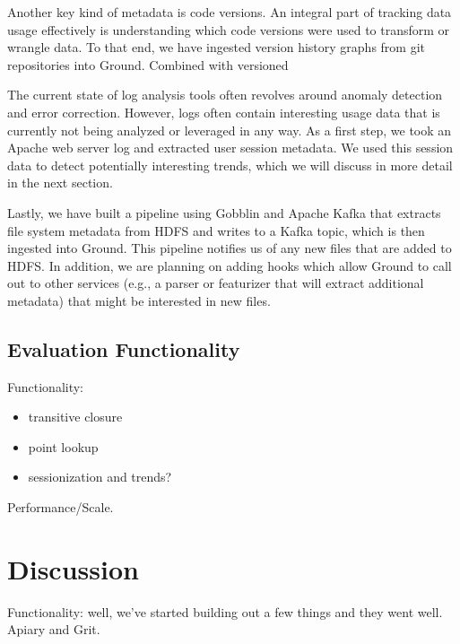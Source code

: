 \documentclass{sig-alternate}
\begin{document}
 Another key kind of metadata is code versions. An integral part of tracking data usage effectively is understanding which code versions were used to transform or wrangle data. To that end, we have ingested version history graphs from git repositories into Ground. Combined with versioned 

 The current state of log analysis tools often revolves around anomaly detection and error correction. However, logs often contain interesting usage data that is currently not being analyzed or leveraged in any way. As a first step, we took an Apache web server log and extracted user session metadata. We used this session data to detect potentially interesting trends, which we will discuss in more detail in the next section.

 Lastly, we have built a pipeline using Gobblin and Apache Kafka that extracts file system metadata from HDFS and writes to a Kafka topic, which is then ingested into Ground. This pipeline notifies us of any new files that are added to HDFS. In addition, we are planning on adding hooks which allow Ground to call out to other services (e.g., a parser or featurizer that will extract additional metadata) that might be interested in new files. 

\subsection{Evaluation Functionality}

Functionality:
\begin{itemize}
\item transitive closure
\item point lookup
\item sessionization and trends?
\end{itemize}

Performance/Scale.

\section{Discussion}
\label{sec:discussion}

Functionality: well, we've started building out a few things and they went well.  Apiary and Grit.
\end{document}
